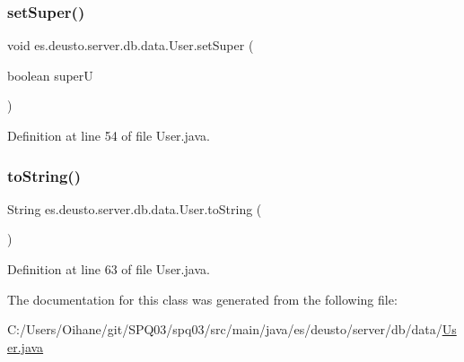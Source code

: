 \subsubsection{\texorpdfstring{set\+Super()}{setSuper()}}
{\footnotesize\ttfamily void es.\+deusto.\+server.\+db.\+data.\+User.\+set\+Super (\begin{DoxyParamCaption}\item[{boolean}]{superU }\end{DoxyParamCaption})}



Definition at line 54 of file User.\+java.

\mbox{\label{classes_1_1deusto_1_1server_1_1db_1_1data_1_1_user_a494980951c4c71c0a793994b7bcd5101}} 
\subsubsection{\texorpdfstring{to\+String()}{toString()}}
{\footnotesize\ttfamily String es.\+deusto.\+server.\+db.\+data.\+User.\+to\+String (\begin{DoxyParamCaption}{ }\end{DoxyParamCaption})}



Definition at line 63 of file User.\+java.



The documentation for this class was generated from the following file\+:\begin{DoxyCompactItemize}
\item 
C\+:/\+Users/\+Oihane/git/\+S\+P\+Q03/spq03/src/main/java/es/deusto/server/db/data/\hyperlink{_user_8java}{User.\+java}\end{DoxyCompactItemize}
